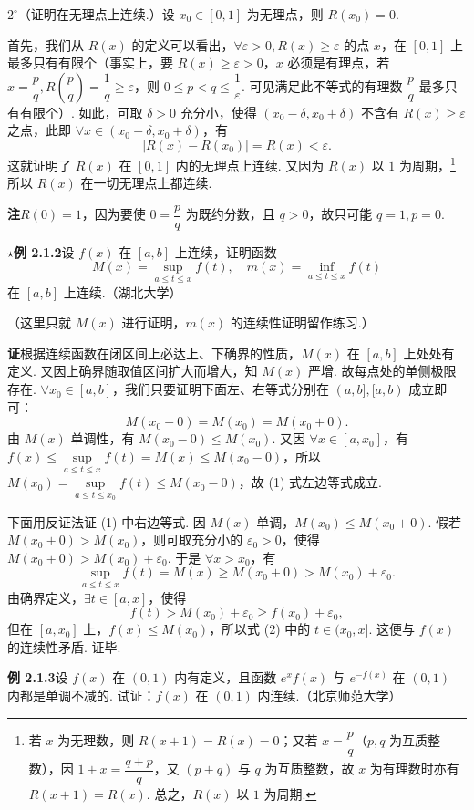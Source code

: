 \documentclass[UTF8, 12pt, fontset=fandol, oneside]{ctexart}
\begin{document}
$2^\circ$（证明在无理点上连续.）设 $x_0\in[0,1]$ 为无理点，则 $R(x_0)=0$.

首先，我们从 $R(x)$ 的定义可以看出，$\forall\varepsilon>0,R(x)\ge\varepsilon$ 的点 $x$，在 $[0,1]$ 上最多只有有限个（事实上，要 $R(x)\ge\varepsilon>0$，$x$ 必须是有理点，若 $x=\dfrac pq,R\left(\dfrac pq\right)=\dfrac1q\ge\varepsilon$，则 $0\le p<q\le\dfrac1\varepsilon$. 可见满足此不等式的有理数 $\dfrac pq$ 最多只有有限个）. 如此，可取 $\delta>0$ 充分小，使得 $(x_0-\delta,x_0+\delta)$ 不含有 $R(x)\ge\varepsilon$ 之点，此即 $\forall x\in(x_0-\delta,x_0+\delta)$，有
\[
  |R(x)-R(x_0)|=R(x)<\varepsilon.
\]
这就证明了 $R(x)$ 在 $[0,1]$ 内的无理点上连续. 又因为 $R(x)$ 以 $1$ 为周期，\footnote{若 $x$ 为无理数，则 $R(x+1)=R(x)=0$；又若 $x=\dfrac pq$（$p,q$ 为互质整数），因 $1+x=\dfrac{q+p}{q}$，又 $(p+q)$ 与 $q$ 为互质整数，故 $x$ 为有理数时亦有 $R(x+1)=R(x)$. 总之，$R(x)$ 以 $1$ 为周期.}所以 $R(x)$ 在一切无理点上都连续.

\noindent\textbf{注}\quad $R(0)=1$，因为要使 $0=\dfrac pq$ 为既约分数，且 $q>0$，故只可能 $q=1,p=0$.

\noindent\textbf{$\star$例 2.1.2}\quad 设 $f(x)$ 在 $[a,b]$ 上连续，证明函数
\[
  M(x)=\sup_{a\le t\le x}f(t),\quad m(x)=\inf_{a\le t\le x}f(t)
\]
在 $[a,b]$ 上连续.（湖北大学）

（这里只就 $M(x)$ 进行证明，$m(x)$ 的连续性证明留作练习.）

\noindent\textbf{证}\quad 根据连续函数在闭区间上必达上、下确界的性质，$M(x)$ 在 $[a,b]$ 上处处有定义. 又因上确界随取值区间扩大而增大，知 $M(x)$ 严增. 故每点处的单侧极限存在. $\forall x_0\in[a,b]$，我们只要证明下面左、右等式分别在 $(a,b],[a,b)$ 成立即可：
\[
  M(x_0-0)=M(x_0)=M(x_0+0).
\tag{1}
\]
由 $M(x)$ 单调性，有 $M(x_0-0)\le M(x_0)$. 又因 $\forall x\in[a,x_0]$，有 $f(x)\le\sup\limits_{a\le t\le x}f(t)=M(x)\le M(x_0-0)$，所以 $M(x_0)=\sup\limits_{a\le t\le x_0}f(t)\le M(x_0-0)$，故 (1) 式左边等式成立.

下面用反证法证 (1) 中右边等式. 因 $M(x)$ 单调，$M(x_0)\le M(x_0+0)$. 假若 $M(x_0+0)>M(x_0)$，则可取充分小的 $\varepsilon_0>0$，使得 $M(x_0+0)>M(x_0)+\varepsilon_0$. 于是 $\forall x>x_0$，有
\[
  \sup_{a\le t\le x}f(t)=M(x)\ge M(x_0+0)>M(x_0)+\varepsilon_0.
\]
由确界定义，$\exists t\in[a,x]$，使得
\[
  f(t)>M(x_0)+\varepsilon_0\ge f(x_0)+\varepsilon_0,
\tag{2}
\]
但在 $[a,x_0]$ 上，$f(x)\le M(x_0)$，所以式 (2) 中的 $t\in(x_0,x]$. 这便与 $f(x)$ 的连续性矛盾. 证毕.

\noindent\textbf{例 2.1.3}\quad 设 $f(x)$ 在 $(0,1)$ 内有定义，且函数 $e^x f(x)$ 与 $e^{-f(x)}$ 在 $(0,1)$ 内都是单调不减的. 试证：$f(x)$ 在 $(0,1)$ 内连续.（北京师范大学）
\end{document}
